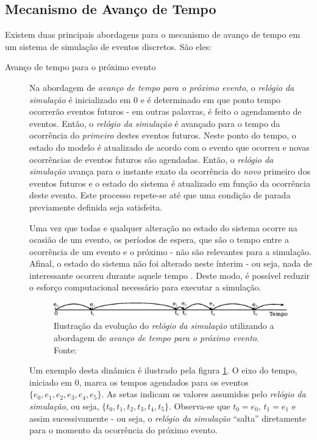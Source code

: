 \subsection{Mecanismo de Avanço de Tempo}

Existem duas principais abordagens para o mecanismo de avanço de tempo em um sistema de simulação de eventos discretos. São eles:

\begin{description}
\item[Avanço de tempo para o próximo evento] \hfill

Na abordagem de \textit{avanço de tempo para o próximo evento}, o
\textit{relógio da simulação} é inicializado em 0 e é determinado em que ponto
tempo ocorrerão eventos futuros - em outras palavras, é feito o agendamento de
eventos. Então, o \textit{relógio da simulação} é avançado para o tempo da
ocorrência do \textit{primeiro} destes eventos futuros. Neste ponto do tempo, o
estado do modelo é atualizado de acordo com o evento que ocorreu e novas
ocorrências de eventos futuros são agendadas. Então, o \textit{relógio da
simulação} avança para o instante exato da ocorrência do \textit{novo} primeiro
dos eventos futuros e o estado do sistema é atualizado em função da ocorrência
deste evento. Este processo repete-se até que uma condição de parada previamente
definida seja satisfeita.

Uma vez que todas e qualquer alteração no estado do sistema ocorre na ocasião de
um evento, os períodos de espera, que são o tempo entre a ocorrência de um
evento e o próximo - não são relevantes para a simulação. Afinal, o estado do
sistema não foi alterado neste ínterim - ou seja, nada de interessante ocorreu
durante aquele tempo \cite{Sim}. Deste modo, é possível reduzir o esforço
computacional necessário para executar a simulação.

\begin{figure}[htb!]
\centering\includegraphics{img/nextevent.eps}
\caption{\label{fig:nextevent}Ilustração da evolução do \textit{relógio da simulação} utilizando a abordagem de \textit{avanço de tempo para o próximo evento}. Fonte:~\cite{Law}}
\end{figure}

Um exemplo desta dinâmica é ilustrado pela figura \ref{fig:nextevent}. O eixo do
tempo, iniciado em 0, marca os tempos agendados para os eventos $\{e_{0}, e_{1},
e_{2}, e_{3}, e_{4}, e_{5}\}$. As setas indicam os valores assumidos pelo
\textit{relógio da simulação}, ou seja, $\{t_{0}, t_{1}, t_{2}, t_{3}, t_{4},
t_{5}\}$. Observa-se que $t_{0} = e_{0}$, $t_{1} = e_{1}$ e assim sucessivamente
- ou seja, o \textit{relógio da simulação} ``salta'' diretamente para o momento
da ocorrência do próximo evento.


\end{description}
